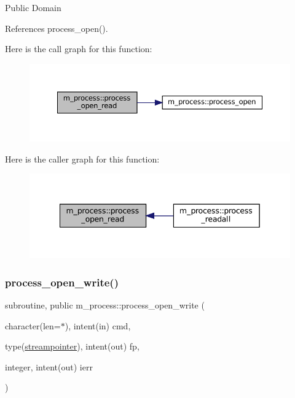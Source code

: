 Public Domain 

References process\+\_\+open().

Here is the call graph for this function\+:
\nopagebreak
\begin{figure}[H]
\begin{center}
\leavevmode
\includegraphics[width=350pt]{namespacem__process_aaaf4d1926258a4cec7da7fc61c38c79d_cgraph}
\end{center}
\end{figure}
Here is the caller graph for this function\+:
\nopagebreak
\begin{figure}[H]
\begin{center}
\leavevmode
\includegraphics[width=342pt]{namespacem__process_aaaf4d1926258a4cec7da7fc61c38c79d_icgraph}
\end{center}
\end{figure}
\mbox{\label{namespacem__process_aa6ed1404ab3472f5068ed15a7a01defc}} 
\subsubsection{\texorpdfstring{process\+\_\+open\+\_\+write()}{process\_open\_write()}}
{\footnotesize\ttfamily subroutine, public m\+\_\+process\+::process\+\_\+open\+\_\+write (\begin{DoxyParamCaption}\item[{character(len=$\ast$), intent(in)}]{cmd,  }\item[{type(\mbox{\hyperlink{structm__process_1_1streampointer}{streampointer}}), intent(out)}]{fp,  }\item[{integer, intent(out)}]{ierr }\end{DoxyParamCaption})}



